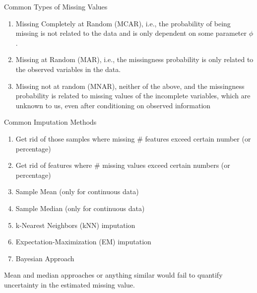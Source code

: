 \documentclass[aspectratio=169,xcolor=dvipsnames,svgnames,x11names,fleqn]{beamer}
\begin{document}
\begin{frame}{Common Types of Missing Values}

\begin{enumerate}

\item Missing Completely at Random (MCAR), i.e., the probability
of being missing is not related to the data and is only dependent on some parameter $\phi$.

\item Missing at Random (MAR), i.e., the missingness probability is only related to the observed variables in the data.

\item Missing not at random (MNAR), neither of the above, and  the missingness probability is related to missing values of the
incomplete variables, which are unknown to us, even after conditioning on observed information

\end{enumerate}

\end{frame}


\begin{frame}{Common Imputation Methods}

\begin{enumerate}

\item Get rid of those samples where missing \# features exceed certain number (or percentage)
\item Get rid of features where \# missing values exceed certain numbers (or percentage)
\item Sample Mean (only for continuous data)
\item Sample Median (only for continuous data) 
\item k-Nearest Neighbors (kNN) imputation
\item Expectation-Maximization (EM) imputation
\item Bayesian Approach
\end{enumerate}

\begin{tblock}{}
Mean and median approaches or anything similar would fail to quantify uncertainty in the estimated missing value.
\end{tblock}

\end{frame}
\end{document}
